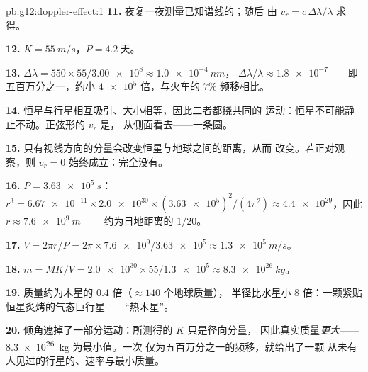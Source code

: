 \begin{solution}{pb:g12:doppler-effect:1}
\textbf{11.} 夜复一夜测量已知谱线的；随后
由 $v_r = c\,\Delta\lambda/\lambda$ 求得。

\textbf{12.} $K = \qty{55}{m/s}$，$P = \qty{4.2}{\text{天}}$。

\textbf{13.} $\Delta\lambda = 550 \times 55/\num{3.00e8} \approx \qty{1.0e-4}{nm}$，
$\Delta\lambda/\lambda \approx \num{1.8e-7}$——即五百万分之一，约小
$\num{4e5}$ 倍，与火车的 $7\%$ 频移相比。

\textbf{14.} 恒星与行星相互吸引、大小相等，因此二者都绕共同的
运动：恒星不可能静止不动。正弦形的 $v_r$ 是，
从侧面看去——一条圆。

\textbf{15.} 只有视线方向的分量会改变恒星与地球之间的距离，从而
改变。若正对观察，则 $v_r = 0$ 始终成立：完全没有。

\textbf{16.} $P = \qty{3.63e5}{s}$：$r^3 = \num{6.67e-11} \times \num{2.0e30} \times
(\num{3.63e5})^2/(4\pi^2) \approx \num{4.4e29}$，因此 $r \approx \qty{7.6e9}{m}$——
约为日地距离的 $1/20$。

\textbf{17.} $V = 2\pi r/P = 2\pi \times \num{7.6e9}/\num{3.63e5} \approx
\qty{1.3e5}{m/s}$。

\textbf{18.} $m = M K/V = \num{2.0e30} \times 55/\num{1.3e5} \approx \qty{8.3e26}{kg}$。

\textbf{19.} 质量约为木星的 $0.4$ 倍（$\approx 140$ 个地球质量），
半径比水星小 $8$ 倍：一颗紧贴恒星炙烤的气态巨行星——“热木星”。

\textbf{20.} 倾角遮掉了一部分运动：所测得的 $K$ 只是径向分量，
因此真实质量\emph{更大}——\qty{8.3e26}{kg} 为最小值。一次
仅为五百万分之一的频移，就给出了一颗
从未有人见过的行星的、速率与最小质量。
\end{solution}

